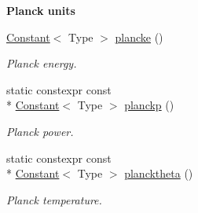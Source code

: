 \begin{Indent}{\bf Planck units}
\begin{DoxyCompactItemize}
\hyperlink{exceptionmagrathea_1_1Constant}{Constant}$<$ Type $>$ \hyperlink{exceptionmagrathea_1_1Constants_ad67de617bb59b48d0f999ea42c065e67}{plancke} ()
\begin{DoxyCompactList}\small\item\em Planck energy. \end{DoxyCompactList}\item 
static constexpr const \\*
\hyperlink{exceptionmagrathea_1_1Constant}{Constant}$<$ Type $>$ \hyperlink{exceptionmagrathea_1_1Constants_ab5b26c2f1271492aed755585835a468f}{planckp} ()
\begin{DoxyCompactList}\small\item\em Planck power. \end{DoxyCompactList}\item 
static constexpr const \\*
\hyperlink{exceptionmagrathea_1_1Constant}{Constant}$<$ Type $>$ \hyperlink{exceptionmagrathea_1_1Constants_add6f9280e6453af7b2d657f1b4bcc3c4}{plancktheta} ()
\begin{DoxyCompactList}\small\item\em Planck temperature. \end{DoxyCompactList}\end{DoxyCompactItemize}
\end{Indent}
